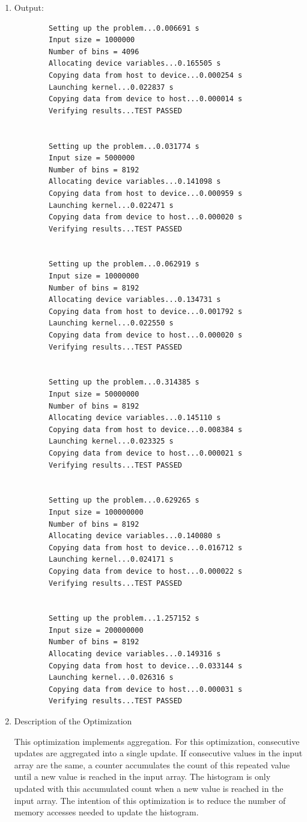 \documentclass{article}
\begin{document}
\begin{enumerate}
	\item Output:
	\begin{verbatim}
		Setting up the problem...0.006691 s
		Input size = 1000000
		Number of bins = 4096
		Allocating device variables...0.165505 s
		Copying data from host to device...0.000254 s
		Launching kernel...0.022837 s
		Copying data from device to host...0.000014 s
		Verifying results...TEST PASSED
		
		
		Setting up the problem...0.031774 s
		Input size = 5000000
		Number of bins = 8192
		Allocating device variables...0.141098 s
		Copying data from host to device...0.000959 s
		Launching kernel...0.022471 s
		Copying data from device to host...0.000020 s
		Verifying results...TEST PASSED
		
		
		Setting up the problem...0.062919 s
		Input size = 10000000
		Number of bins = 8192
		Allocating device variables...0.134731 s
		Copying data from host to device...0.001792 s
		Launching kernel...0.022550 s
		Copying data from device to host...0.000020 s
		Verifying results...TEST PASSED
		
		
		Setting up the problem...0.314385 s
		Input size = 50000000
		Number of bins = 8192
		Allocating device variables...0.145110 s
		Copying data from host to device...0.008384 s
		Launching kernel...0.023325 s
		Copying data from device to host...0.000021 s
		Verifying results...TEST PASSED
		
		
		Setting up the problem...0.629265 s
		Input size = 100000000
		Number of bins = 8192
		Allocating device variables...0.140080 s
		Copying data from host to device...0.016712 s
		Launching kernel...0.024171 s
		Copying data from device to host...0.000022 s
		Verifying results...TEST PASSED
		
		
		Setting up the problem...1.257152 s
		Input size = 200000000
		Number of bins = 8192
		Allocating device variables...0.149316 s
		Copying data from host to device...0.033144 s
		Launching kernel...0.026316 s
		Copying data from device to host...0.000031 s
		Verifying results...TEST PASSED
	\end{verbatim}
	
	\item Description of the Optimization
	
	This optimization implements aggregation. For this optimization, consecutive updates are aggregated into a single update. If consecutive values in the input array are the same, a counter accumulates the count of this repeated value until a new value is reached in the input array. The histogram is only updated with this accumulated count when a new value is reached in the input array. The intention of this optimization is to reduce the number of memory accesses needed to update the histogram.
	

\end{enumerate}
\end{document}
